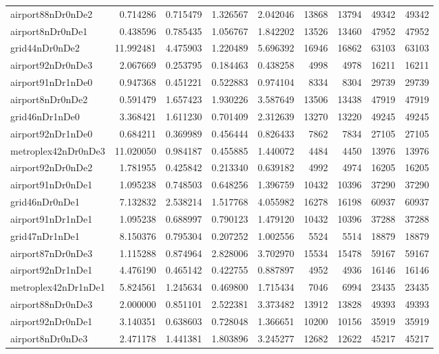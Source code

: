 \begin{longtable}{|l|r|r|r|r|r|r|r|r|}
airport88nDr0nDe2 & 0.714286 & 0.715479 & 1.326567 & 2.042046 & 13868 & 13794 & 49342 & 49342 \\
airport8nDr0nDe1 & 0.438596 & 0.785435 & 1.056767 & 1.842202 & 13526 & 13460 & 47952 & 47952 \\
grid44nDr0nDe2 & 11.992481 & 4.475903 & 1.220489 & 5.696392 & 16946 & 16862 & 63103 & 63103 \\
airport92nDr0nDe3 & 2.067669 & 0.253795 & 0.184463 & 0.438258 & 4998 & 4978 & 16211 & 16211 \\
airport91nDr1nDe0 & 0.947368 & 0.451221 & 0.522883 & 0.974104 & 8334 & 8304 & 29739 & 29739 \\
airport8nDr0nDe2 & 0.591479 & 1.657423 & 1.930226 & 3.587649 & 13506 & 13438 & 47919 & 47919 \\
grid46nDr1nDe0 & 3.368421 & 1.611230 & 0.701409 & 2.312639 & 13270 & 13220 & 49245 & 49245 \\
airport92nDr1nDe0 & 0.684211 & 0.369989 & 0.456444 & 0.826433 & 7862 & 7834 & 27105 & 27105 \\
metroplex42nDr0nDe3 & 11.020050 & 0.984187 & 0.455885 & 1.440072 & 4484 & 4450 & 13976 & 13976 \\
airport92nDr0nDe2 & 1.781955 & 0.425842 & 0.213340 & 0.639182 & 4992 & 4974 & 16205 & 16205 \\
airport91nDr0nDe1 & 1.095238 & 0.748503 & 0.648256 & 1.396759 & 10432 & 10396 & 37290 & 37290 \\
grid46nDr0nDe1 & 7.132832 & 2.538214 & 1.517768 & 4.055982 & 16278 & 16198 & 60937 & 60937 \\
airport91nDr1nDe1 & 1.095238 & 0.688997 & 0.790123 & 1.479120 & 10432 & 10396 & 37288 & 37288 \\
grid47nDr1nDe1 & 8.150376 & 0.795304 & 0.207252 & 1.002556 & 5524 & 5514 & 18879 & 18879 \\
airport87nDr0nDe3 & 1.115288 & 0.874964 & 2.828006 & 3.702970 & 15534 & 15478 & 59167 & 59167 \\
airport92nDr1nDe1 & 4.476190 & 0.465142 & 0.422755 & 0.887897 & 4952 & 4936 & 16146 & 16146 \\
metroplex42nDr1nDe1 & 5.824561 & 1.245634 & 0.469800 & 1.715434 & 7046 & 6994 & 23435 & 23435 \\
airport88nDr0nDe3 & 2.000000 & 0.851101 & 2.522381 & 3.373482 & 13912 & 13828 & 49393 & 49393 \\
airport92nDr0nDe1 & 3.140351 & 0.638603 & 0.728048 & 1.366651 & 10200 & 10156 & 35919 & 35919 \\
airport8nDr0nDe3 & 2.471178 & 1.441381 & 1.803896 & 3.245277 & 12682 & 12622 & 45217 & 45217 \\

\end{longtable}
